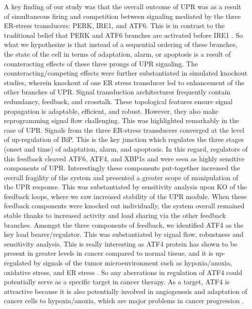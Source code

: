 \documentclass[fleqn,10pt]{wlscirep}
\begin{document}
A key finding of our study was that the overall outcome of UPR was as a result of simultaneous firing and competition between signaling mediated by the three ER-stress transducers: PERK, IRE1, and ATF6.
This is in contrast to the traditional belief that PERK and ATF6 branches are activated before IRE1 \cite{szegezdi2006mediators}.
So what we hypothesize is that instead of a sequential ordering of these branches, the state of the cell in terms of adaptation, alarm, or apoptosis is a result of counteracting effects of these three prongs of UPR signaling.
The counteracting/competing effects were further substantiated in simulated knockout studies, wherein knockout of one ER stress transducer led to enhancement of the other branches of UPR.
Signal transduction architectures frequently contain redundancy, feedback, and crosstalk. These topological features ensure signal propagation is adaptable, efficient, and robust.
However, they also make reprogramming signal flow challenging. This was highlighted remarkably in the case of UPR. Signals from the three ER-stress transducers converged at the level of up-regulation of BiP.
This is the key junction which regulates the three stages (onset and time) of adaptation, alarm, and apoptosis. In this regard, regulators of this feedback cleaved ATF6, ATF4, and XBP1s and were seen as highly sensitive components of UPR.
Interestingly these components put-together increased the overall fragility of the system and presented a greater scope of manipulation of the UPR response.
This was substantiated by sensitivity analysis upon KO of the feedback loops, where we saw increased stability of the UPR module.
When these feedback components were knocked out individually, the system overall remained stable thanks to increased activity and load sharing via the other feedback branches.
Amongst the three components of feedback, we identified ATF4 as the key load bearer/regulator. This was substantiated by signal flow, robustness and sensitivity analysis.
This is really interesting as ATF4 protein has shown to be present in greater levels in cancer compared to normal tissue, and it is up-regulated by signals of the tumor microenvironment such as hypoxia/anoxia, oxidative stress, and ER stress \cite{Ameri:2008fk}.
So any aberrations in regulation of ATF4 could potentially serve as a specific target in cancer therapy.
As a target, ATF4 is attractive because it is also potentially involved in angiogenesis and adaptation of cancer cells to hypoxia/anoxia, which are major problems in cancer progression \cite{Ameri:2008fk}.
\end{document}
